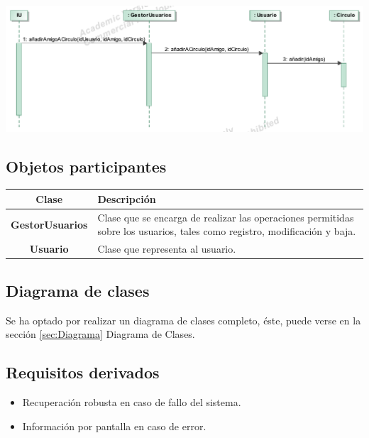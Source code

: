\documentclass[12pt, a4paper, titlepage]{article}
\begin{document}
\begin{center}
	\includegraphics{Imagenes/OperacionAnadirAmigoACirculo}
\end{center}



\subsection{Objetos participantes}

\begin{center}

\begin{tabular}{|c|p{14cm}|}
	\hline
	\textbf{Clase} & \textbf{Descripción}\\ \hline
	\textbf{GestorUsuarios} &  Clase que se encarga de realizar las operaciones permitidas sobre los usuarios, tales como registro, modificación y baja.\\ \hline
	\textbf{Usuario} & Clase que representa al usuario. \\ \hline
\end{tabular}

\end{center}


\subsection{Diagrama de clases}
Se ha optado por realizar un diagrama de clases completo, éste, puede verse en la sección \ref{sec:Diagrama} Diagrama de Clases.
\subsection{Requisitos derivados}
\begin{itemize}
	\item Recuperación robusta en caso de fallo del sistema.
	\item Información por pantalla en caso de error.
\end{itemize}
\end{document}
